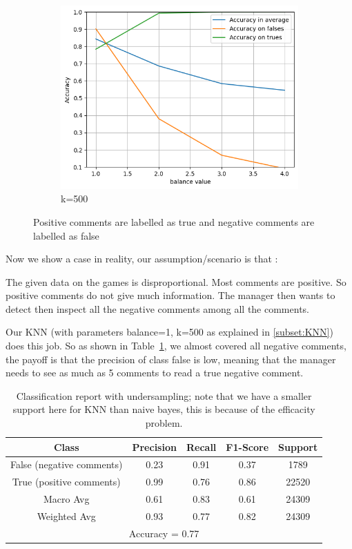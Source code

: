 \documentclass{article}
\begin{document}
\begin{figure}[H]
\begin{subfigure}[t]{0.33\textwidth}
    \includegraphics[width=\linewidth]{balancek500.png}
    \caption{k=500}
  \end{subfigure}
  \caption{Positive comments are labelled as true and negative comments are labelled as false}
  \label{fig:balancenk}
\end{figure}

Now we show a case in reality, our assumption/scenario is that :

The given data on the games is disproportional. Most comments are
positive. So positive comments do not give much information.
The manager then wants to detect then inspect all the negative comments
among all the comments.

Our KNN (with parameters balance=1, k=500 as explained in \ref{subset:KNN}) does this job.
So as shown in Table~\ref{tab:KNN}, we almost covered all negative comments,
the payoff is that the precision of class false is low, meaning
that the manager needs to see as much as 5 comments to read a true negative
comment.

\begin{table}[h]
  \centering
  \begin{tabular}{ccccc}
  \hline
  Class & Precision & Recall & F1-Score & Support \\
  \hline
  False (negative comments) & 0.23 & 0.91 & 0.37 & 1789 \\
  True (positive comments) & 0.99 & 0.76 & 0.86 & 22520 \\
  \hline
  Macro Avg & 0.61 & 0.83 & 0.61 & 24309 \\
  Weighted Avg & 0.93 & 0.77 & 0.82 & 24309 \\
  \hline
  \multicolumn{5}{c}{Accuracy = 0.77} \\
  \hline
  \end{tabular}
  \caption{Classification report with undersampling; note that
  we have a smaller support here for KNN than naive bayes,
  this is because of the efficacity problem.}
  \label{tab:KNN}
\end{table}
\end{document}
